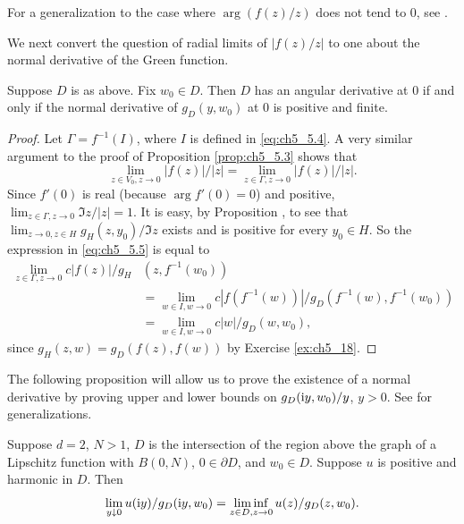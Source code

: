 
For a generalization to the case where $\arg(f(z)/z)$ does not tend to $0$, see \cite{Pommerenke1975}.

We next convert the question of radial limits of $|f(z)/z|$ to one about the normal derivative of the Green function.

\begin{proposition}\label{prop:ch5_5.4}
Suppose $D$ is as above. Fix $w_0 \in D$. Then $D$ has an angular derivative at $0$ if and only if the normal derivative of $g_D(y,w_0)$ at $0$ is positive and finite.
\end{proposition}

\begin{proof}
Let $\Gamma = f^{-1}(I)$, where $I$ is defined in \eqref{eq:ch5_5.4}. A very similar argument to the proof of Proposition \ref{prop:ch5_5.3} shows that
\begin{equation}\label{eq:ch5_5.5}
    \lim_{z \in V_0,z \to 0}|f(z)|/|z| = \lim_{z \in \Gamma,z \to 0}|f(z)|/|z|.
\end{equation}
Since $f'(0)$ is real (because $\arg f'(0) = 0$) and positive, $\lim_{z \in \Gamma,z \to 0} \Im z/|z| \allowbreak = 1$. It is easy, by Proposition , to see that $\lim_{z \to 0,z \in H} g_H(z,y_0)/\Im z$ exists and is positive for every $y_0 \in H$. So the expression in \eqref{eq:ch5_5.5} is equal to
\begin{align*}
    \lim_{z \in \Gamma,z \to 0} c|f(z)|/g_H&(z,f^{-1}(w_0)) \\
    &= \lim_{w \in I,w \to 0} c|f(f^{-1}(w))|/g_D(f^{-1}(w),f^{-1}(w_0)) \\
    &= \lim_{w \in I,w \to 0} c|w|/g_D(w,w_0),
\end{align*}
since $g_H(z,w) = g_D(f(z),f(w))$ by Exercise \ref{ex:ch5_18}.
\end{proof}


The following proposition will allow us to prove the existence of a normal derivative by proving upper and lower bounds on $g_D(\mathrm{i} y,w_0)/y$, $y > 0$. See \cite{Bass1994} for generalizations.

\begin{proposition}\label{prop:ch5_5.5}
Suppose $d = 2$, $N > 1$, $D$ is the intersection of the region above the graph of a Lipschitz function with $B(0,N)$, $0 \in \partial D$, and $w_0 \in D$. Suppose $u$ is positive and harmonic in $D$. Then
\begin{equation}\label{eq:ch5_5.6}
    \lim_{y\downarrow 0} u(\mathrm{i} y)/g_D(\mathrm{i} y,w_0) = \liminf_{z \in D,z \to 0} u(z)/g_D(z,w_0).
\end{equation}
\end{proposition}

